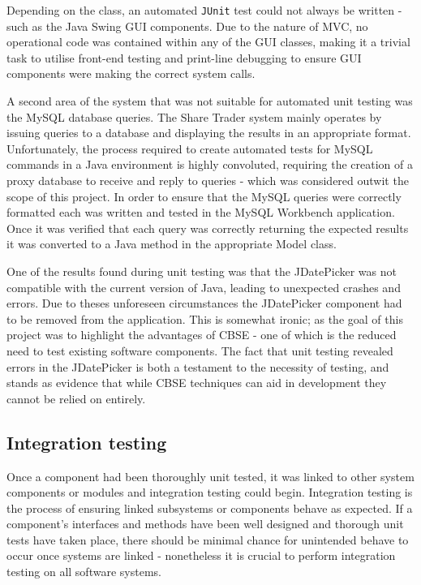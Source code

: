 \documentclass[12pt, a4paper,titlepage]{article}
\begin{document}
Depending on the class, an automated {\tt JUnit} test could not always be
written - such as the Java Swing GUI components. 
Due to the nature of MVC, no operational code was contained within any of the
GUI classes, making it a trivial task to utilise front-end testing and
print-line debugging to ensure GUI components were making the correct system
calls.

A second area of the system that was not suitable for automated unit testing
was the MySQL database queries. 
The Share Trader system mainly operates by issuing queries to a database and
displaying the results in an appropriate format. 
Unfortunately, the process required to create automated tests for
MySQL commands in a Java environment is highly convoluted, requiring the
creation of a proxy database to receive and reply to queries - which was
considered outwit the scope of this project. 
In order to ensure that the MySQL queries were correctly formatted each was
written and tested in the MySQL Workbench application. 
Once it was verified that each query was correctly returning the expected
results it was converted to a Java method in the appropriate Model class.

One of the results  found during  unit testing was that the JDatePicker was
not compatible with the current version of Java, leading to unexpected crashes
and errors.
Due to theses unforeseen circumstances the JDatePicker component had to be
removed from the application.
This is somewhat ironic; as the goal of this project was to highlight the
advantages of CBSE - one of which is the reduced need to test existing
software components.
The fact that unit testing revealed errors in the JDatePicker is both a
testament to the necessity of testing, and stands as evidence that while CBSE
techniques can aid in development they cannot be relied on entirely.

\subsection{Integration testing}
Once a component had been thoroughly unit tested, it was linked to other
system components or modules and integration testing could begin. 
Integration testing is the process of ensuring linked subsystems or components
behave as expected.
If a component's interfaces and methods have been well designed and
thorough unit tests have taken place, there should be minimal chance for
unintended behave to occur once systems are linked - nonetheless it is crucial
to perform integration testing on all software systems.  
\end{document}
